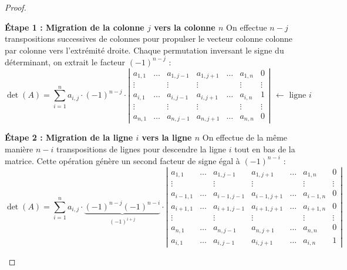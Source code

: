 \documentclass[12pt, a4paper]{report}
\begin{document}
\begin{proof}
    \begin{outline}
        \1 \textbf{Étape 1 : Migration de la colonne $j$ vers la colonne $n$}
        \2 On effectue $n-j$ transpositions successives de colonnes pour propulser le vecteur colonne colonne par colonne vers l'extrémité droite. Chaque permutation inversant le signe du déterminant, on extrait le facteur $(-1)^{n-j}$ :
        $$\det(A) = \sum_{i=1}^n a_{i,j} \cdot (-1)^{n-j} \cdot \left|\begin{matrix} 
            a_{1,1} & \dots & a_{1,j-1} & a_{1,j+1} & \dots & a_{1,n} & 0 \\
            \vdots & & \vdots & \vdots & & \vdots & \vdots \\
            a_{i,1} & \dots & a_{i,j-1} & a_{i,j+1} & \dots & a_{i,n} & 1 \\
            \vdots & & \vdots & \vdots & & \vdots & \vdots \\
            a_{n,1} & \dots & a_{n,j-1} & a_{n,j+1} & \dots & a_{n,n} & 0
        \end{matrix}\right| \begin{matrix} \ \\ \ \\ \leftarrow \text{ ligne } i \\ \ \\ \ \end{matrix}$$

        \1 \textbf{Étape 2 : Migration de la ligne $i$ vers la ligne $n$}
        \2 On effectue de la même manière $n-i$ transpositions de lignes pour descendre la ligne $i$ tout en bas de la matrice. Cette opération génère un second facteur de signe égal à $(-1)^{n-i}$ :
        $$\det(A) = \sum_{i=1}^n a_{i,j} \cdot \underbrace{(-1)^{n-j} (-1)^{n-i}}_{(-1)^{i+j}} \cdot \left|\begin{matrix} 
            a_{1,1} & \dots & a_{1,j-1} & a_{1,j+1} & \dots & a_{1,n} & 0 \\
            \vdots & & \vdots & \vdots & & \vdots & \vdots \\
            a_{i-1,1} & \dots & a_{i-1,j-1} & a_{i-1,j+1} & \dots & a_{i-1,n} & 0 \\
            a_{i+1,1} & \dots & a_{i+1,j-1} & a_{i+1,j+1} & \dots & a_{i+1,n} & 0 \\
            \vdots & & \vdots & \vdots & & \vdots & \vdots \\
            a_{n,1} & \dots & a_{n,j-1} & a_{n,j+1} & \dots & a_{n,n} & 0 \\
            a_{i,1} & \dots & a_{i,j-1} & a_{i,j+1} & \dots & a_{i,n} & 1
        \end{matrix}\right|$$
    \end{outline}


\end{proof}
\end{document}
